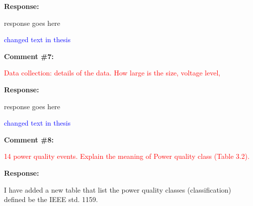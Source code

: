\documentclass[journal]{IEEEtran}
\begin{document}
\vspace{10pt}
\textbf{Response:}
\begin{adjustwidth}{2.5em}{0pt}
response goes here

\vspace{10pt}
\noindent\textcolor{blue}{changed text in thesis}
\end{adjustwidth}


\vspace{30pt}
\textbf{Comment \#7:}
\begin{adjustwidth}{2.5em}{0pt}
\singlespacing \vspace{-10pt}
\textcolor{red}{Data collection: details of the data. How large is the size, voltage level,}
\end{adjustwidth}

\vspace{10pt}
\textbf{Response:}
\begin{adjustwidth}{2.5em}{0pt}
response goes here

\vspace{10pt}
\noindent\textcolor{blue}{changed text in thesis}
\end{adjustwidth}


\vspace{30pt}
\textbf{Comment \#8:}
\begin{adjustwidth}{2.5em}{0pt}
\singlespacing \vspace{-10pt}
\textcolor{red}{14 power quality events. Explain the meaning of Power quality class (Table 3.2).}
\end{adjustwidth}

\vspace{10pt}
\textbf{Response:}
\begin{adjustwidth}{2.5em}{0pt}
I have added a new table that list the power quality classes (classification) defined be the IEEE std. 1159.
\end{adjustwidth}
\end{document}
